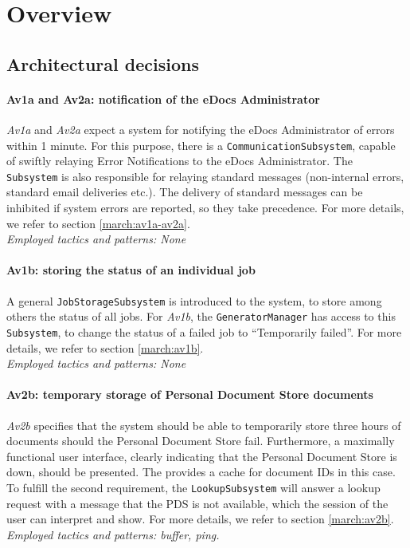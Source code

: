 \section{Overview}\label{sec:overview}
\subsection{Architectural decisions}

\paragraph{Av1a and Av2a: notification of the eDocs Administrator}
\emph{Av1a} and \emph{Av2a} expect a system for notifying the eDocs Administrator of errors within 1 minute. For this purpose, there is a \texttt{CommunicationSubsystem}, capable of swiftly relaying Error Notifications to the eDocs Administrator. The \texttt{Subsystem} is also responsible for relaying standard messages (non-internal errors, standard email deliveries etc.). The delivery of standard messages can be inhibited if system errors are reported, so they take precedence. For more details, we refer to section \ref{march:av1a-av2a}.\\
\emph{Employed tactics and patterns: None}
    
\paragraph{Av1b: storing the status of an individual job}
A general \texttt{JobStorageSubsystem} is introduced to the system, to store among others the status of all jobs. For \emph{Av1b}, the \texttt{GeneratorManager} has access to this \texttt{Subsystem}, to change the status of a failed job to ``Temporarily failed''. For more details, we refer to section \ref{march:av1b}.\\
\emph{Employed tactics and patterns: None}
    
\paragraph{Av2b: temporary storage of Personal Document Store documents} \emph{Av2b} specifies that the system should be able to temporarily store three hours of documents should the Personal Document Store fail. Furthermore, a maximally functional user interface, clearly indicating that the Personal Document Store is down, should be presented. The  provides a cache for document IDs in this case. To fulfill the second requirement, the \texttt{LookupSubsystem} will answer a lookup request with a message that the PDS is not available, which the session of the user can interpret and show. For more details, we refer to section \ref{march:av2b}.\\
\emph{Employed tactics and patterns: buffer, ping.}
    
